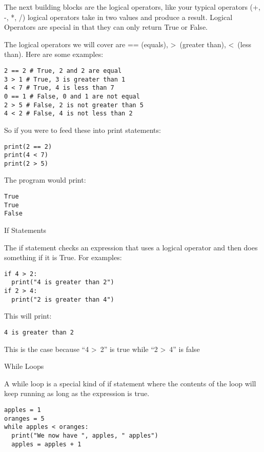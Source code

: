 \documentclass[12pt,oneside]{article}
\newcommand{\q}[1]{``#1''}
\newcommand{\subsectitle}[1]{
  \begin{flushleft}{\large#1}\end{flushleft}
}
\begin{document}
The next building blocks are the logical operators, like your typical operators (+, -, *, /) logical operators take in two values and produce a result. Logical Operators are special in that they can only return True or False. 

The logical operators we will cover are == (equals), \textgreater~(greater than), \textless~(less than). Here are some examples:

\begin{lstlisting}
2 == 2 # True, 2 and 2 are equal
3 > 1 # True, 3 is greater than 1
4 < 7 # True, 4 is less than 7
0 == 1 # False, 0 and 1 are not equal
2 > 5 # False, 2 is not greater than 5
4 < 2 # False, 4 is not less than 2
\end{lstlisting}

So if you were to feed these into print statements:

\begin{lstlisting}
print(2 == 2)
print(4 < 7)
print(2 > 5)
\end{lstlisting}

The program would print:

\begin{lstlisting}
True
True
False
\end{lstlisting}


\subsectitle{If Statements}

The if statement checks an expression that uses a logical operator and then does something if it is True. For examples:

\begin{lstlisting}
if 4 > 2:
  print("4 is greater than 2")
if 2 > 4:
  print("2 is greater than 4")
\end{lstlisting}

This will print:

\begin{lstlisting}
4 is greater than 2
\end{lstlisting}

This is the case because \q{4 \textgreater~2} is true while \q{2 \textgreater~4} is false

\subsectitle{While Loops}

A while loop is a special kind of if statement where the contents of the loop will keep running as long as the expression is true.

\begin{lstlisting}
apples = 1
oranges = 5
while apples < oranges:
  print("We now have ", apples, " apples")
  apples = apples + 1
\end{lstlisting}
\end{document}
